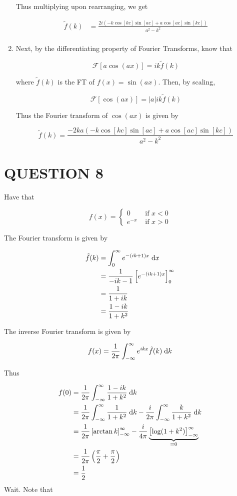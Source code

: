 \documentclass[a4paper]{article}
\begin{document}
\begin{enumerate}
	Thus multiplying upon rearranging, we get
	
	\begin{align*}
	\tilde{f}(k) & = \frac{2i \left(  - k \cos[kc]\sin[ac] + a \cos[ac]\sin[kc]   \right)}{a^{2} - k^{2}} \\
	\end{align*}
	
	\item Next, by the differentiating property of Fourier Transforms, know that
	
	\[ \mathcal{F}[a\cos(ax)] = ik\tilde{f}(k) \]
	
	where $ \tilde{f}(k) $ is the FT of $ f(x) = \sin(ax) $. Then, by scaling,
	
	\[ \mathcal{F}[\cos(ax)] = | a | ik\tilde{f}(k) \]
	
	Thus the Fourier transform of $ \cos(ax) $ is given by
	
	\[ \tilde{f}(k) = \frac{-2ka \left(  - k \cos[kc]\sin[ac] + a \cos[ac]\sin[kc]   \right)}{a^{2} - k^{2}}  \]
	
	
	
\end{enumerate}

\section{QUESTION 8}

Have that

\[ f(x) = \begin{cases} 0  & \text{ if } x < 0 \\ e^{-x} & \text{ if } x > 0 \end{cases} \]

The Fourier transform is given by 

\begin{align*}
\tilde{f}(k) & = \int_{0}^{\infty} e^{-(ik + 1)x} \; \mathrm{d} x   \\
& = \frac{1}{-ik - 1}\left[  e^{-(ik + 1)x} \right]_{0}^{\infty} \\
& = \frac{1}{1 + ik } \\
& = \frac{1 - ik}{1 + k^{2}}
 \end{align*}
 
The inverse Fourier transform is given by

\[ f(x) = \frac{1}{2\pi} \int_{-\infty}^{\infty} e^{ikx} \tilde{f}(k) \; \mathrm{d} k  \]

Thus

\begin{align*}
f(0) & = \frac{1}{2\pi} \int_{-\infty}^{\infty}\frac{1 - ik}{1 + k^{2}} \; \mathrm{d} k   \\
& = \frac{1}{2\pi} \int_{-\infty}^{\infty} \frac{1}{1 + k^{2}} \; \mathrm{d} k  -  \frac{i}{2\pi} \int_{-\infty}^{\infty}  \frac{k}{1 + k^{2}} \; \mathrm{d} k   \\
& = \frac{1}{2\pi} \left[  \arctan k \right]_{-\infty}^{\infty} - \frac{i}{4\pi} \underbrace{\left[  \log (1 + k^{2}) \right]_{-\infty}^{\infty}}_{=0}  \\
& = \frac{1}{2\pi} \left(  \frac{\pi}{2} + \frac{\pi}{2} \right) \\
& = \frac{1}{2}
\end{align*}
Wait. Note that 
\end{document}

